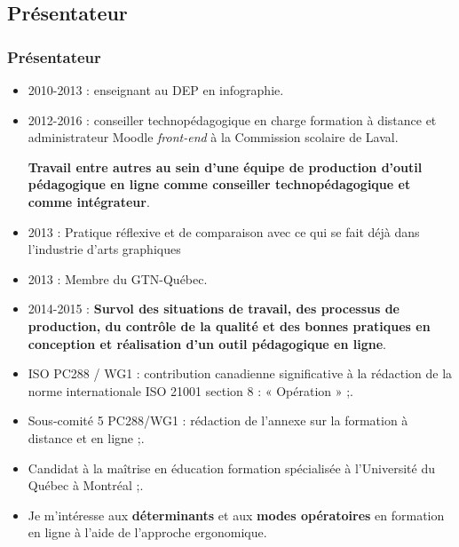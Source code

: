 		
	\subsection{Présentateur} 
		\begin{frame}[allowframebreaks]
			\frametitle{Présentateur}
			\begin {itemize}
				
                                \item 2010-2013 : enseignant au DEP en  infographie.
                                \item 2012-2016 : conseiller technopédagogique en charge formation à distance et administrateur Moodle \textit{front-end} à la Commission scolaire de Laval. \par \textbf{Travail entre autres au sein d’une équipe de production d’outil pédagogique en ligne comme conseiller technopédagogique et comme intégrateur}.
                                \item 2013 : Pratique réflexive et de comparaison avec ce qui se fait déjà dans l’industrie d’arts graphiques
                                \item 2013 : Membre du GTN-Québec.
                                \item 2014-2015 : \textbf{Survol des situations de travail, des processus de production, du contrôle de la qualité et des bonnes pratiques en conception et réalisation d’un outil pédagogique en ligne}.  
                                \item ISO PC288 / WG1 : contribution canadienne significative à la rédaction de la norme internationale ISO 21001 section 8 : « Opération » ;.
                                \item Sous-comité 5 PC288/WG1 : rédaction de l’annexe sur la formation à distance et en ligne ;.
                                \item Candidat à la maîtrise en éducation formation spécialisée à l'Université du Québec à Montréal ;.
                                \item Je m'intéresse aux \textbf{déterminants} et aux \textbf{modes opératoires} en formation en ligne à l’aide de l’approche ergonomique.



			\end{itemize}
		\end{frame}
			
